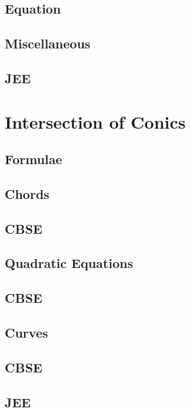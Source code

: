 \documentclass[journal]{IEEEtran}
\begin{document}
	\subsection{Equation}
	
	\subsection{Miscellaneous}
	
	\subsection{JEE}
	
	\newpage
	\section{Intersection of Conics}
	\subsection{Formulae}
	
	\subsection{Chords}
	
	\subsection{CBSE}
	
	\subsection{Quadratic Equations}
	
	\subsection{CBSE}
	
	\subsection{Curves}
	
	\subsection{CBSE}
	
	\subsection{JEE}
	
	
\end{document}
